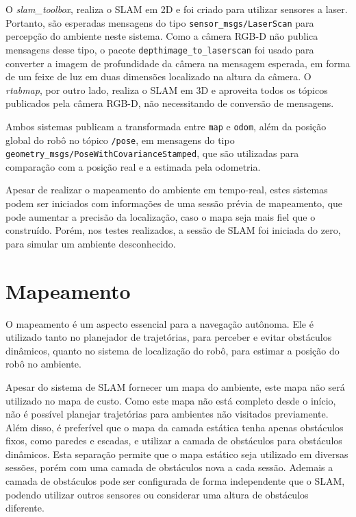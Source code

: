 \documentclass[repeatfields,xlists,xpacks,oneside,yearsonly]{ufrgscca}
\begin{document}
O \textit{slam\_toolbox}, realiza o SLAM em 2D e foi criado para
utilizar sensores a laser. Portanto, são esperadas mensagens do tipo
\texttt{sensor\_msgs/LaserScan} para percepção do ambiente neste
sistema. Como a câmera RGB-D não publica mensagens desse tipo, o
pacote \texttt{depthimage\_to\_laserscan} foi usado para converter a
imagem de profundidade da câmera na mensagem esperada, em forma de um
feixe de luz em duas dimensões localizado na altura da câmera. O
\textit{rtabmap}, por outro lado, realiza o SLAM em 3D e aproveita
todos os tópicos publicados pela câmera RGB-D, não necessitando de
conversão de mensagens.

Ambos sistemas publicam a transformada entre \texttt{map} e
\texttt{odom}, além da posição global do robô no tópico
\texttt{/pose}, em mensagens do tipo
\texttt{geometry\_msgs/PoseWithCovarianceStamped}, que são utilizadas
para comparação com a posição real e a estimada pela odometria.

Apesar de realizar o mapeamento do ambiente em tempo-real, estes
sistemas podem ser iniciados com informações de uma sessão prévia de
mapeamento, que pode aumentar a precisão da localização, caso o mapa
seja mais fiel que o construído. Porém, nos testes realizados, a
sessão de SLAM foi iniciada do zero, para simular um ambiente
desconhecido.

\section{Mapeamento}

O mapeamento é um aspecto essencial para a navegação autônoma. Ele é
utilizado tanto no planejador de trajetórias, para perceber e evitar
obstáculos dinâmicos, quanto no sistema de localização do robô, para
estimar a posição do robô no ambiente.

Apesar do sistema de SLAM fornecer um mapa do ambiente, este mapa não
será utilizado no mapa de custo. Como este mapa não está completo
desde o início, não é possível planejar trajetórias para ambientes
não visitados previamente. Além disso, é preferível que o mapa da
camada estática tenha apenas obstáculos fixos, como paredes e
escadas, e utilizar a camada de obstáculos para obstáculos dinâmicos.
Esta separação permite que o mapa estático seja utilizado em diversas
sessões, porém com uma camada de obstáculos nova a cada sessão.
Ademais a camada de obstáculos pode ser configurada de forma
independente que o SLAM, podendo utilizar outros sensores ou
considerar uma altura de obstáculos diferente.
\end{document}
